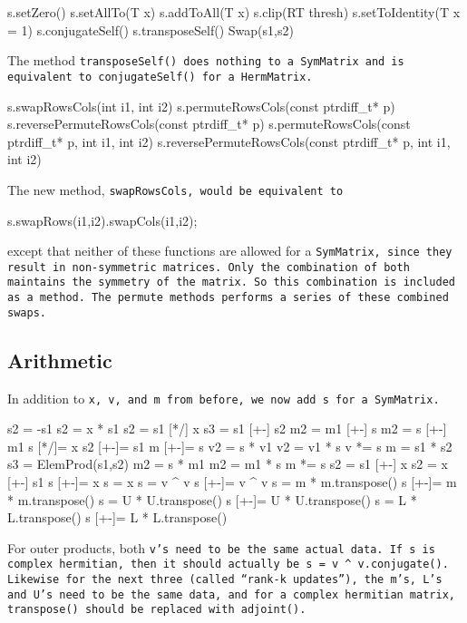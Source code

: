 \begin{tmvcode}
s.setZero()
s.setAllTo(T x)
s.addToAll(T x)
s.clip(RT thresh)
s.setToIdentity(T x = 1)
s.conjugateSelf()
s.transposeSelf()
Swap(s1,s2)
\end{tmvcode}
The method \tt{transposeSelf()} does nothing to a \tt{SymMatrix} and is equivalent to
\tt{conjugateSelf()} for a \tt{HermMatrix}.
\begin{tmvcode}
s.swapRowsCols(int i1, int i2)
s.permuteRowsCols(const ptrdiff_t* p)
s.reversePermuteRowsCols(const ptrdiff_t* p)
s.permuteRowsCols(const ptrdiff_t* p, int i1, int i2)
s.reversePermuteRowsCols(const ptrdiff_t* p, int i1, int i2)
\end{tmvcode}
The new method, \tt{swapRowsCols}, would be equivalent to 
\begin{tmvcode}
s.swapRows(i1,i2).swapCols(i1,i2);
\end{tmvcode}
except that neither of these functions are allowed for a \tt{SymMatrix}, since 
they result in non-symmetric matrices.  Only the combination of both
maintains the symmetry of the matrix.  So this combination is included as
a method.  The permute methods performs a series of these
combined swaps.
\vspace{12pt}

\subsection{Arithmetic}
\label{SymMatrix_Arithmetic}

In addition to \tt{x}, \tt{v}, and \tt{m} from before,
we now add \tt{s} for a \tt{SymMatrix}.

\begin{tmvcode}
s2 = -s1
s2 = x * s1
s2 = s1 [*/] x
s3 = s1 [+-] s2
m2 = m1 [+-] s
m2 = s [+-] m1
s [*/]= x
s2 [+-]= s1
m [+-]= s
v2 = s * v1
v2 = v1 * s
v *= s
m = s1 * s2
s3 = ElemProd(s1,s2)
m2 = s * m1
m2 = m1 * s
m *= s
s2 = s1 [+-] x
s2 = x [+-] s1
s [+-]= x
s = x
s = v ^ v
s [+-]= v ^ v
s = m * m.transpose()
s [+-]= m * m.transpose()
s = U * U.transpose()
s [+-]= U * U.transpose()
s = L * L.transpose()
s [+-]= L * L.transpose()
\end{tmvcode}
For outer products, both \tt{v}'s need to be the same actual data.  If \tt{s}
is complex hermitian, then it should actually be 
\tt{s = v ^ v.conjugate()}.
Likewise for the next three (called ``rank-k updates''), the \tt{m}'s, \tt{L}'s and
\tt{U}'s need to be the
same data, and for a complex hermitian matrix, \tt{transpose()}
should be replaced with \tt{adjoint()}.

